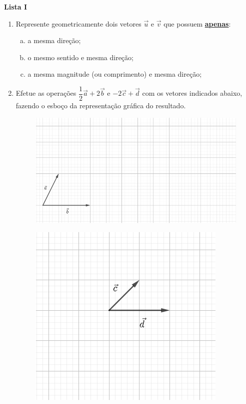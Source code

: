\documentclass[12pt,a4paper]{article}
\begin{document}
\begin{center}
  \textbf{Lista I}
\end{center}

\begin{enumerate}

  \item Represente geometricamente dois vetores $\vec{u}$ e $\vec{v}$ que possuem
    \underline{\textbf{apenas}}:
  
    \begin{enumerate}[(a)]
      \item a mesma direção;
      \item o mesmo sentido e mesma direção;
      \item a mesma magnitude (ou comprimento) e mesma direção;
    \end{enumerate}
  
  \item Efetue as operações $\dfrac{1}{2}\vec{a} + 2\vec{b}$ e $-2\vec{c} + \vec{d}$
  com os vetores indicados abaixo, fazendo o esboço da representação gráfica do resultado.

  \begin{figure}[!htb]
    \centering
    \includegraphics[scale=0.5]{imagem/lista-i-questao-1-a}
  \end{figure}

  \begin{figure}[!htb]
    \centering
    \includegraphics[scale=0.5]{imagem/lista-i-questao-1-b}
  \end{figure}


\end{enumerate}
\end{document}
